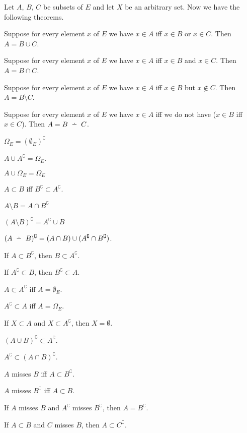 \documentclass{article}
\begin{document}
Let $A$, $B$, $C$ be subsets of $E$ and let $X$ be an arbitrary set.
Now we have the following theorems.
\begin{thm}
\item\label{subset1:5} Suppose for every element $x$ of $E$ we have
  $x\in A$ iff $x\in B$ or $x\in C$. Then $A=B\cup C$.
\item\label{subset1:6} Suppose for every element $x$ of $E$ we have
  $x\in A$ iff $x\in B$ and $x\in C$. Then $A=B\cap C$.
\item\label{subset1:7} Suppose for every element $x$ of $E$ we have
  $x\in A$ iff $x\in B$ but $x\notin C$. Then $A=B\setminus C$.
\item\label{subset1:8} Suppose for every element $x$ of $E$ we have
  $x\in A$ iff we do not have ($x\in B$ iff $x\in C$). Then $A=B\symdiff C$.
\item\label{subset1:9} $\Omega_{E} = (\emptyset_{E})^{\complement}$
\item\label{subset1:10} $A\cup A^{\complement}=\Omega_{E}$.
\item\label{subset1:11} $A\cup\Omega_{E}=\Omega_{E}$
\item\label{subset1:12} $A\subset B$ iff $B^{\complement}\subset A^{\complement}$.
\item\label{subset1:13} $A\setminus B = A\cap B^{\complement}$ 
\item\label{subset1:14} $(A\setminus B)^{\complement} = A^{\complement}\cup B$
\item\label{subset1:15} $(A\symdiff B)^{\complement} = (A\cap B)\cup(A^{\complement}\cap B^{\complement})$.
\item\label{subset1:16} If $A\subset B^{\complement}$, then $B\subset A^{\complement}$.
\item\label{subset1:17} If $A^{\complement}\subset B$, then
  $B^{\complement}\subset A$.
\item\label{subset1:18} $A\subset A^{\complement}$ iff $A=\emptyset_{E}$.
\item\label{subset1:19} $A^{\complement}\subset A$ iff $A=\Omega_{E}$.
\item\label{subset1:20} If $X\subset A$ and $X\subset A^{\complement}$,
  then $X=\emptyset$.
\item\label{subset1:21} $(A\cup B)^{\complement}\subset A^{\complement}$.
\item\label{subset1:22} $A^{\complement}\subset(A\cap B)^{\complement}$.
\item\label{subset1:23} $A$ misses $B$ iff $A\subset B^{\complement}$.
\item\label{subset1:24} $A$ misses $B^{\complement}$ iff $A\subset B$. 
\item\label{subset1:25} If $A$ misses $B$ and $A^{\complement}$ misses
  $B^{\complement}$, then $A=B^{\complement}$.
\item\label{subset1:26} If $A\subset B$ and $C$ misses $B$, then
  $A\subset C^{\complement}$.
\end{thm}
\end{document}
